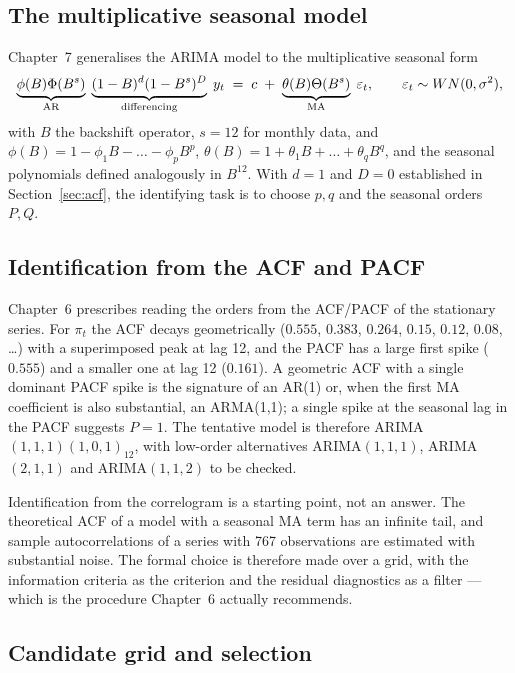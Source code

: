 \subsection{The multiplicative seasonal model}

Chapter~7 generalises the ARIMA model to the multiplicative seasonal form
\begin{equation}
\underbrace{\phi(B)\Phi(B^{s})}_{\text{AR}}\;
\underbrace{(1-B)^{d}(1-B^{s})^{D}}_{\text{differencing}}\;
y_t \;=\; c \;+\;
\underbrace{\theta(B)\Theta(B^{s})}_{\text{MA}}\;\varepsilon_t ,
\qquad \varepsilon_t \sim WN(0,\sigma^2),
\label{eq:sarima}
\end{equation}
with $B$ the backshift operator, $s=12$ for monthly data, and
$\phi(B)=1-\phi_1B-\dots-\phi_pB^p$, $\theta(B)=1+\theta_1B+\dots+\theta_qB^q$,
and the seasonal polynomials defined analogously in $B^{12}$. With $d=1$ and
$D=0$ established in Section~\ref{sec:acf}, the identifying task is to choose
$p,q$ and the seasonal orders $P,Q$.

\subsection{Identification from the ACF and PACF}

Chapter~6 prescribes reading the orders from the ACF/PACF of the stationary series.
For $\pi_t$ the ACF decays geometrically ($0.555$, $0.383$, $0.264$, $0.15$,
$0.12$, $0.08$, \dots) with a superimposed peak at lag 12, and the PACF has a large
first spike ($0.555$) and a smaller one at lag 12 ($0.161$). A geometric ACF with a
single dominant PACF spike is the signature of an AR(1) or, when the first MA
coefficient is also substantial, an ARMA(1,1); a single spike at the seasonal lag
in the PACF suggests $P=1$. The tentative model is therefore
ARIMA$(1,1,1)(1,0,1)_{12}$, with low-order alternatives
ARIMA$(1,1,1)$, ARIMA$(2,1,1)$ and ARIMA$(1,1,2)$ to be checked.

Identification from the correlogram is a starting point, not an answer. The
theoretical ACF of a model with a seasonal MA term has an infinite tail, and
sample autocorrelations of a series with 767 observations are estimated with
substantial noise. The formal choice is therefore made over a grid, with the
information criteria as the criterion and the residual diagnostics as a filter ---
which is the procedure Chapter~6 actually recommends.

\subsection{Candidate grid and selection}

